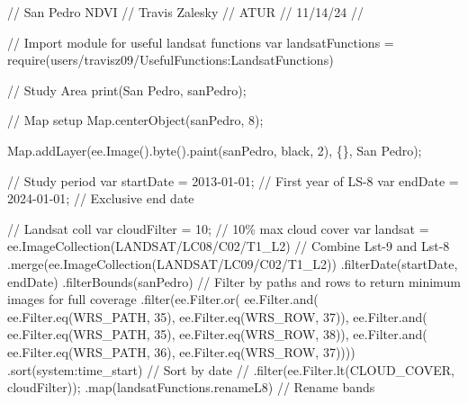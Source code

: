\documentclass[
]{agujournal2019}
\newenvironment{Shaded}{\begin{snugshade}}{\end{snugshade}}
\newcommand{\NormalTok}[1]{\textcolor[rgb]{0.00,0.23,0.31}{#1}}
\begin{document}
\begin{Shaded}
\begin{Highlighting}[]
\NormalTok{// San Pedro NDVI}
\NormalTok{// Travis Zalesky}
\NormalTok{// ATUR}
\NormalTok{// 11/14/24}
\NormalTok{// }

\NormalTok{// Import module for useful landsat functions}
\NormalTok{var landsatFunctions = require(\textquotesingle{}users/travisz09/UsefulFunctions:LandsatFunctions\textquotesingle{})}

\NormalTok{// Study Area}
\NormalTok{print(\textquotesingle{}San Pedro\textquotesingle{}, sanPedro);}

\NormalTok{// Map setup}
\NormalTok{Map.centerObject(sanPedro, 8);}

\NormalTok{Map.addLayer(ee.Image().byte().paint(sanPedro, \textquotesingle{}black\textquotesingle{}, 2), \{\}, \textquotesingle{}San Pedro\textquotesingle{});}

\NormalTok{// Study period}
\NormalTok{var startDate = \textquotesingle{}2013{-}01{-}01\textquotesingle{};  // First year of LS{-}8}
\NormalTok{var endDate = \textquotesingle{}2024{-}01{-}01\textquotesingle{};  // Exclusive end date}

\NormalTok{// Landsat coll}
\NormalTok{var cloudFilter = 10;  // 10\% max cloud cover}
\NormalTok{var landsat  = ee.ImageCollection(\textquotesingle{}LANDSAT/LC08/C02/T1\_L2\textquotesingle{})}
\NormalTok{  // Combine Lst{-}9 and Lst{-}8}
\NormalTok{  .merge(ee.ImageCollection(\textquotesingle{}LANDSAT/LC09/C02/T1\_L2\textquotesingle{}))  }
\NormalTok{  .filterDate(startDate, endDate)}
\NormalTok{  .filterBounds(sanPedro)}
\NormalTok{  // Filter by paths and rows to return minimum images for full coverage}
\NormalTok{  .filter(ee.Filter.or(}
\NormalTok{    ee.Filter.and(}
\NormalTok{      ee.Filter.eq(\textquotesingle{}WRS\_PATH\textquotesingle{}, 35),}
\NormalTok{      ee.Filter.eq(\textquotesingle{}WRS\_ROW\textquotesingle{}, 37)),}
\NormalTok{    ee.Filter.and(}
\NormalTok{      ee.Filter.eq(\textquotesingle{}WRS\_PATH\textquotesingle{}, 35),}
\NormalTok{      ee.Filter.eq(\textquotesingle{}WRS\_ROW\textquotesingle{}, 38)),}
\NormalTok{    ee.Filter.and(}
\NormalTok{      ee.Filter.eq(\textquotesingle{}WRS\_PATH\textquotesingle{}, 36),}
\NormalTok{      ee.Filter.eq(\textquotesingle{}WRS\_ROW\textquotesingle{}, 37))))}
\NormalTok{  .sort(\textquotesingle{}system:time\_start\textquotesingle{})  // Sort by date}
\NormalTok{  // .filter(ee.Filter.lt(\textquotesingle{}CLOUD\_COVER\textquotesingle{}, cloudFilter));}
\NormalTok{  .map(landsatFunctions.renameL8)  // Rename bands}
  

\end{Highlighting}
\end{Shaded}
\end{document}
